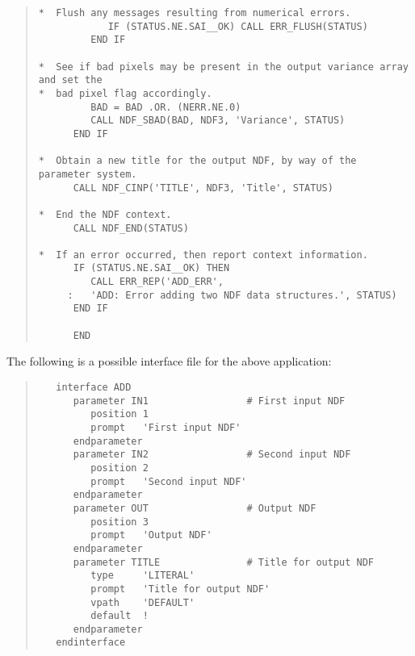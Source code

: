 \begin{quote}
\begin{small}
\begin{verbatim}
*  Flush any messages resulting from numerical errors.
            IF (STATUS.NE.SAI__OK) CALL ERR_FLUSH(STATUS)
         END IF

*  See if bad pixels may be present in the output variance array and set the
*  bad pixel flag accordingly.
         BAD = BAD .OR. (NERR.NE.0)
         CALL NDF_SBAD(BAD, NDF3, 'Variance', STATUS)
      END IF

*  Obtain a new title for the output NDF, by way of the parameter system.
      CALL NDF_CINP('TITLE', NDF3, 'Title', STATUS)
      
*  End the NDF context.
      CALL NDF_END(STATUS)

*  If an error occurred, then report context information.
      IF (STATUS.NE.SAI__OK) THEN
         CALL ERR_REP('ADD_ERR',
     :   'ADD: Error adding two NDF data structures.', STATUS)
      END IF

      END
\end{verbatim}
\end{small}

\end{quote}

The following is a possible interface file for the above application:

\begin{quote}
\begin{small}
\begin{verbatim}
   interface ADD
      parameter IN1                 # First input NDF
         position 1
         prompt   'First input NDF'
      endparameter
      parameter IN2                 # Second input NDF
         position 2
         prompt   'Second input NDF'
      endparameter
      parameter OUT                 # Output NDF
         position 3
         prompt   'Output NDF'
      endparameter
      parameter TITLE               # Title for output NDF
         type     'LITERAL'
         prompt   'Title for output NDF'
         vpath    'DEFAULT'
         default  !
      endparameter
   endinterface
\end{verbatim}
\end{small}
\end{quote}
